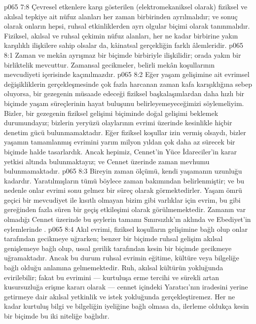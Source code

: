 \vs p065 7:8 Çevresel etkenlere karşı gösterilen (elektromekaniksel olarak) fiziksel ve akılsal tepkiye ait nüfuz alanları her zaman birbirinden ayrılmalıdır; ve sonuç olarak onların hepsi, ruhsal etkinliklerden ayrı olgular biçimi olarak tanınmalıdır. Fiziksel, akılsal ve ruhsal çekimin nüfuz alanları, her ne kadar birbirine yakın karşılıklı ilişkilere sahip olsalar da, kâinatsal gerçekliğin farklı âlemleridir.
\vs p065 8:1 Zaman ve mekân ayrışmaz bir biçimde birbiriyle ilişkilidir; orada yakın bir birliktelik mevcuttur. Zamansal gecikmeler, belirli mekân koşullarının mevcudiyeti içerisinde kaçınılmazdır.
\vs p065 8:2 Eğer yaşam gelişimine ait evrimsel değişikliklerin gerçekleşmesinde çok fazla harcanan zaman kafa karışıklığına sebep oluyorsa, bir gezegenin müsaade edeceği fiziksel başkalaşımlardan daha hızlı bir biçimde yaşam süreçlerinin hayat buluşunu belirleyemeyeceğimizi söylemeliyim. Bizler, bir gezegenin fiziksel gelişimi biçiminde doğal gelişimi beklemek durumundayız; bizlerin yeryüzü olaylarının evrimi üzerinde kesinlikle hiçbir denetim gücü bulunmamaktadır. Eğer fiziksel koşullar izin vermiş olsaydı, bizler yaşamın tamamlanmış evrimini yarım milyon yıldan çok daha az sürecek bir biçimde halde tasarlardık. Ancak hepimiz, Cennet’in Yüce İdareciler’in karar yetkisi altında bulunmaktayız; ve Cennet üzerinde zaman mevhumu bulunmamaktadır.
\vs p065 8:3 Bireyin zaman ölçümü, kendi yaşamanın uzunluğu kadardır. Yaratılmışların tümü böylece zaman bakımından belirlenmiştir; ve bu nedenle onlar evrimi sonu gelmez bir süreç olarak görmektedirler. Yaşam ömrü geçici bir mevcudiyet ile kısıtlı olmayan bizim gibi varlıklar için evrim, bu gibi gereğinden fazla süren bir geçiş etkileşimi olarak görülmemektedir. Zamanın var olmadığı Cennet üzerinde bu şeylerin tamamı Sınırsızlık’ın aklında ve Ebediyet’in eylemlerinde .
\vs p065 8:4 Akıl evrimi, fiziksel koşulların gelişimine bağlı olup onlar tarafından gecikmeye uğrarken; benzer bir biçimde ruhsal gelişim akılsal genişlemeye bağlı olup, ussal gerilik tarafından kesin bir biçimde gecikmeye uğramaktadır. Ancak bu durum ruhsal evrimin eğitime, kültüre veya bilgeliğe bağlı olduğu anlamına gelmemektedir. Ruh, akılsal kültürün yokluğunda evirilebilir; fakat bu evrimini --- kurtuluşa erme tercihi ve sürekli artan kusursuzluğa erişme kararı olarak --- cennet içindeki Yaratıcı’nın iradesini yerine getirmeye dair akılsal yetkinlik ve istek yokluğunda gerçekleştiremez. Her ne kadar kurtuluş bilgi ve bilgeliğin iyeliğine bağlı olmasa da, ilerleme oldukça kesin bir biçimde bu iki niteliğe bağlıdır.
